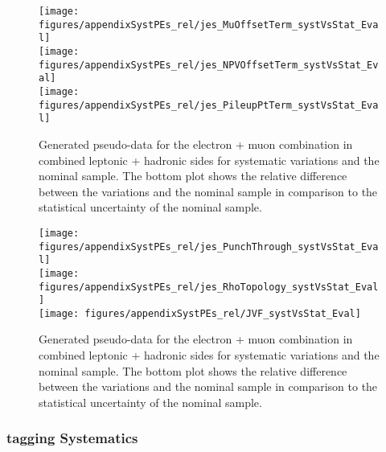 \begin{figure}[!hb]
\begin{center}
        \texttt{[image: figures/appendixSystPEs\_rel/jes\_MuOffsetTerm\_systVsStat\_Eval]}\\
        \texttt{[image: figures/appendixSystPEs\_rel/jes\_NPVOffsetTerm\_systVsStat\_Eval]}\\
        \texttt{[image: figures/appendixSystPEs\_rel/jes\_PileupPtTerm\_systVsStat\_Eval]}
\caption{Generated pseudo-data for the electron + muon combination in combined leptonic + hadronic sides for systematic variations and the nominal \ttbar sample. The bottom plot shows the relative difference between the variations and the nominal sample in comparison to the statistical uncertainty of the nominal sample.}   
\label{fig:systematicVar_lephad_JES_4_2}
\end{center}
\end{figure}
\begin{figure}[!hb]
\begin{center}
        \texttt{[image: figures/appendixSystPEs\_rel/jes\_PunchThrough\_systVsStat\_Eval]}\\
        \texttt{[image: figures/appendixSystPEs\_rel/jes\_RhoTopology\_systVsStat\_Eval]} \\
        \texttt{[image: figures/appendixSystPEs\_rel/JVF\_systVsStat\_Eval]}

\caption{Generated pseudo-data for the electron + muon combination in combined leptonic + hadronic sides for systematic variations and the nominal \ttbar sample. The bottom plot shows the relative difference between the variations and the nominal sample in comparison to the statistical uncertainty of the nominal sample.}   
\label{fig:systematicVar_lephad_JES_5}
\end{center}
\end{figure}

\clearpage
\subsubsection{\bt tagging Systematics}

